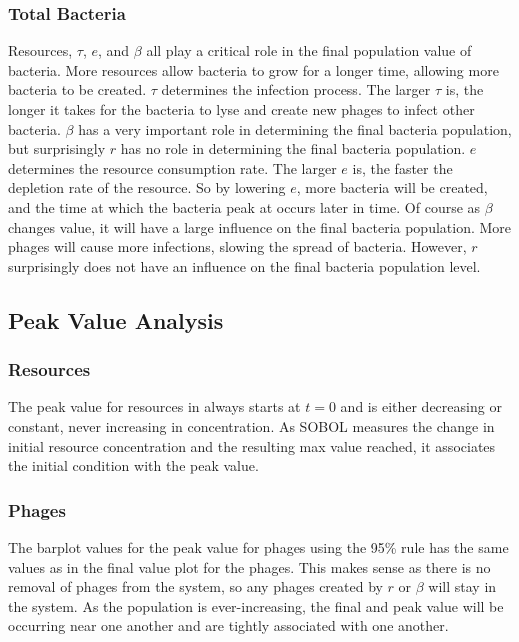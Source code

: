 \subsubsection{Total Bacteria}
Resources, $\tau$, $e$, and $\beta$ all play a critical role in the final population value of bacteria. 
More resources allow bacteria to grow for a longer time, allowing more bacteria to be created. 
$\tau$ determines the infection process. 
The larger $\tau$ is, the longer it takes for the bacteria to lyse and create new phages to infect other bacteria. 
$\beta$ has a very important role in determining the final bacteria population, but surprisingly $r$ has no role in determining the final bacteria population. 
$e$ determines the resource consumption rate. 
The larger $e$ is, the faster the depletion rate of the resource. 
So by lowering $e$, more bacteria will be created, and the time at which the bacteria peak at occurs later in time. 
Of course as $\beta$ changes value, it will have a large influence on the final bacteria population. 
More phages will cause more infections, slowing the spread of bacteria. 
However, $r$ surprisingly does not have an influence on the final bacteria population level. 


\subsection{Peak Value Analysis}
\subsubsection{Resources}
The peak value for resources in always starts at $t=0$ and is either decreasing or constant, never increasing in concentration. 
As SOBOL measures the change in initial resource concentration and the resulting max value reached, it associates the initial condition with the peak value. 

\subsubsection{Phages}
The barplot values for the peak value for phages using the 95\% rule has the same values as in the final value plot for the phages. 
This makes sense as there is no removal of phages from the system, so any phages created by $r$ or $\beta$ will stay in the system. 
As the population is ever-increasing, the final and peak value will be occurring near one another and are tightly associated with one another. 

